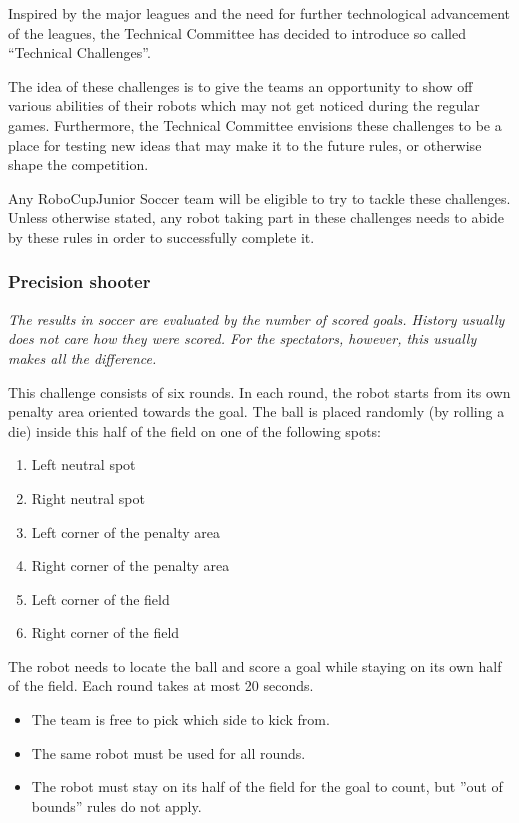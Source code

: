 \documentclass{article}
\begin{document}
Inspired by the major leagues and the need for further technological
advancement of the leagues, the Technical Committee has decided to introduce so
called ``Technical Challenges''.

The idea of these challenges is to give the teams an opportunity to show off
various abilities of their robots which may not get noticed during the regular
games. Furthermore, the Technical Committee envisions these challenges to be a
place for testing new ideas that may make it to the future rules, or otherwise
shape the competition.

Any RoboCupJunior Soccer team will be eligible to try to tackle these
challenges. Unless otherwise stated, any robot taking part in these
challenges needs to abide by these rules in order to successfully complete it.

\subsubsection{Precision shooter}

\textit{The results in soccer are evaluated by the number of
scored goals. History usually does not care how they were scored. For
the spectators, however, this usually makes all the difference.}

This challenge consists of six rounds. In each round, the robot
starts from its own penalty area oriented towards the goal. The ball is
placed randomly (by rolling a die) inside this half of the field on one of
the following spots:

\begin{enumerate}
    \item Left neutral spot
    \item Right neutral spot
    \item Left corner of the penalty area
    \item Right corner of the penalty area
    \item Left corner of the field
    \item Right corner of the field
\end{enumerate}

The robot needs to locate the ball and score a goal while
staying on its own half of the field. Each round takes at most 20 seconds.

\begin{itemize}
    \item The team is free to pick which side to kick from.
    \item The same robot must  be used for all rounds.
    \item The robot must stay on its half of the field for the
            goal to count, but ''out of bounds'' rules do not apply.
\end{itemize}
\end{document}
